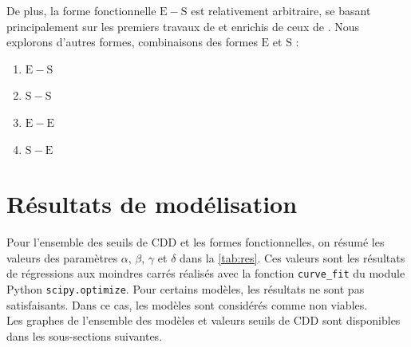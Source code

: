 \documentclass{article}
\begin{document}
De plus, la forme fonctionnelle $\mathrm{E-S}$ est relativement arbitraire, se basant principalement sur les premiers travaux de \textcite{sailor_air_2003} et enrichis de ceux de \textcite{mcneil_future_2008}. Nous explorons d'autres formes, combinaisons des formes $\mathrm{E}$ et $\mathrm{S}$ : 
\begin{enumerate}
      \item $\mathrm{E-S}$
      \item $\mathrm{S-S}$
      \item $\mathrm{E-E}$
      \item $\mathrm{S-E}$
\end{enumerate}

\clearpage 
\section{Résultats de modélisation}

Pour l'ensemble des seuils de CDD et les formes fonctionnelles, on résumé les valeurs des paramètres $\alpha$, $\beta$, $\gamma$ et $\delta$ dans la \ref{tab:res}. Ces valeurs sont les résultats de régressions aux moindres carrés réalisés avec la fonction \texttt{curve\_fit} du module Python \texttt{scipy.optimize}. Pour certains modèles, les résultats ne sont pas satisfaisants. Dans ce cas, les modèles sont considérés comme non viables. \\

Les graphes de l'ensemble des modèles et valeurs seuils de CDD sont disponibles dans les sous-sections suivantes. 
\end{document}
